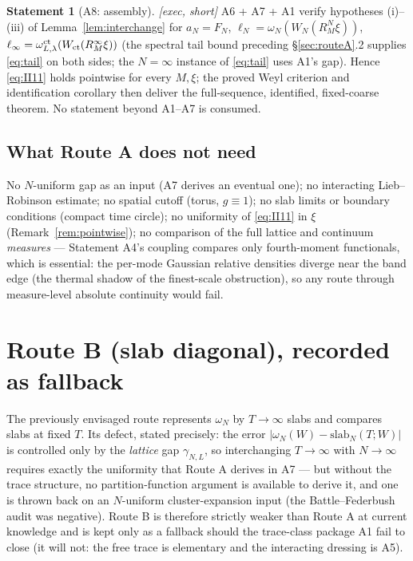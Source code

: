 \documentclass[11pt,a4paper]{article}
\theoremstyle{plain}
\theoremstyle{definition}
\newtheorem{statement}[theorem]{Statement}
\begin{document}
\begin{statement}[A8: assembly]\label{st:A8}
\emph{[exec, short]} A6 + A7 + A1 verify hypotheses (i)--(iii) of
Lemma~\ref{lem:interchange} for $a_N=F_N$, $\ell_N=\omega_N(W_N(R_M^N\xi))$,
$\ell_\infty=\omega^{\rm ct}_{L,\lambda}(W_{\rm ct}(R_M^\infty\xi))$ (the spectral tail
bound preceding \S\ref{sec:routeA}.2 supplies \eqref{eq:tail} on both sides; the
$N=\infty$ instance of \eqref{eq:tail} uses A1's gap). Hence \eqref{eq:II11} holds
pointwise for every $M,\xi$; the proved Weyl criterion and identification corollary
then deliver the full-sequence, identified, fixed-coarse theorem. No statement beyond
A1--A7 is consumed.
\end{statement}

\subsection{What Route A does not need}
No $N$-uniform gap as an input (A7 derives an eventual one); no interacting
Lieb--Robinson estimate; no spatial cutoff (torus, $g\equiv1$); no slab limits or
boundary conditions (compact time circle); no uniformity of \eqref{eq:II11} in $\xi$
(Remark~\ref{rem:pointwise}); no comparison of the full lattice and continuum
\emph{measures} --- Statement A4's coupling compares only fourth-moment functionals,
which is essential: the per-mode Gaussian relative densities diverge near the band
edge (the thermal shadow of the finest-scale obstruction), so any route through
measure-level absolute continuity would fail.

\section{Route B (slab diagonal), recorded as fallback}\label{sec:routeB}

The previously envisaged route represents $\omega_N$ by $T\to\infty$ slabs and
compares slabs at fixed $T$. Its defect, stated precisely: the error
$|\omega_N(W)-\mathrm{slab}_N(T;W)|$ is controlled only by the \emph{lattice} gap
$\gamma_{N,L}$, so interchanging $T\to\infty$ with $N\to\infty$ requires exactly the
uniformity that Route A derives in A7 --- but without the trace structure, no
partition-function argument is available to derive it, and one is thrown back on an
$N$-uniform cluster-expansion input (the Battle--Federbush audit was negative). Route
B is therefore strictly weaker than Route A at current knowledge and is kept only as
a fallback should the trace-class package A1 fail to close (it will not: the free
trace is elementary and the interacting dressing is A5).
\end{document}
